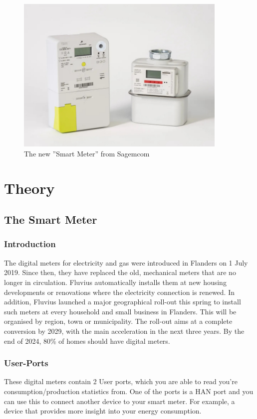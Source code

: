 \documentclass[a4paper,twoside, 12pt]{report}
\theoremstyle{break}
\begin{document}
\begin{figure}[H]
  \centering
  \includegraphics[width=0.9\textwidth]{SmartMeter.jpg}
  \caption{The new ''Smart Meter'' from Sagemcom}
\end{figure}

\eject


\chapter{Theory}


\section{The Smart Meter}

\subsection{Introduction}

The digital meters for electricity and gas were introduced in Flanders on 1 July 2019. Since then, they have replaced the old, mechanical meters that are no longer in circulation. Fluvius automatically installs them at new housing developments or renovations where the electricity connection is renewed. In addition, Fluvius launched a major geographical roll-out this spring to install such meters at every household and small business in Flanders. This will be organised by region, town or municipality. The roll-out aims at a complete conversion by 2029, with the main acceleration in the next three years. By the end of 2024, 80\% of homes should have digital meters.

\subsection{User-Ports}
These digital meters contain 2 User ports, which you are able to read you're consumption/production statistics from. One of the ports is a HAN port and you can use this to connect another device to your smart meter. For example, a device that provides more insight into your energy consumption.
\vfill
\eject
\end{document}
